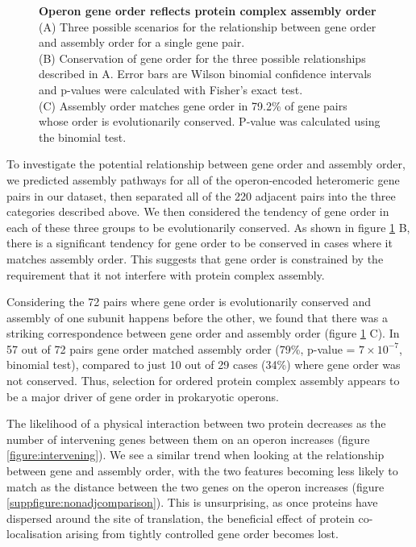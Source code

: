 \documentclass[a4paper,11pt,twoside,openright]{scrbook}
\begin{document}
\begin{figure}[h]
    \caption[Operon gene order reflects protein complex assembly order]{\sffamily \textbf{Operon gene order reflects protein complex assembly order} \\ \small (A) Three possible scenarios for the relationship between gene order and assembly order for a single gene pair.\\
    (B) Conservation of gene order for the three possible relationships described in A. Error bars are Wilson binomial confidence intervals and p-values were calculated with Fisher's exact test.\\
    (C) Assembly order matches gene order in 79.2\% of gene pairs whose order is evolutionarily conserved. P-value was calculated using the binomial test.}
    \label{figure:operonassembly}
\end{figure}

To investigate the potential relationship between gene order and assembly order, we predicted assembly pathways for all of the operon-encoded heteromeric gene pairs in our dataset, then separated all of the 220 adjacent pairs into the three categories described above. We then considered the tendency of gene order in each of these three groups to be evolutionarily conserved. As shown in figure \ref{figure:operonassembly} B, there is a significant tendency for gene order to be conserved in cases where it matches assembly order. This suggests that gene order is constrained by the requirement that it not interfere with protein complex assembly.

Considering the 72 pairs where gene order is evolutionarily conserved and assembly of one subunit happens before the other, we found that there was a striking correspondence between gene order and assembly order (figure \ref{figure:operonassembly} C). In 57 out of 72 pairs gene order matched assembly order (79\%, p-value = \(7 \times 10^{-7}\), binomial test), compared to just 10 out of 29 cases (34\%) where gene order was not conserved. Thus, selection for ordered protein complex assembly appears to be a major driver of gene order in prokaryotic operons.

The likelihood of a physical interaction between two protein decreases as the number of intervening genes between them on an operon increases (figure \ref{figure:intervening}). We see a similar trend when looking at the relationship between gene and assembly order, with the two features becoming less likely to match as the distance between the two genes on the operon increases (figure \ref{suppfigure:nonadjcomparison}). This is unsurprising, as once proteins have dispersed around the site of translation, the beneficial effect of protein co-localisation arising from tightly controlled gene order becomes lost.
\end{document}
